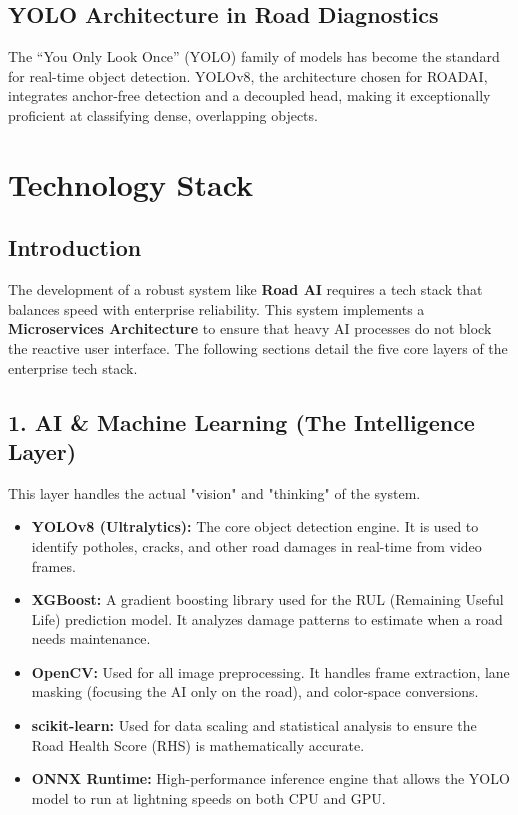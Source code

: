 \documentclass[12pt,a4paper]{report}
\begin{document}
\section{YOLO Architecture in Road Diagnostics}
The ``You Only Look Once'' (YOLO) family of models has become the standard for real-time object detection. YOLOv8, the architecture chosen for ROADAI, integrates anchor-free detection and a decoupled head, making it exceptionally proficient at classifying dense, overlapping objects.

\chapter{Technology Stack}

\section{Introduction}
The development of a robust system like \textbf{Road AI} requires a tech stack that balances speed with enterprise reliability. This system implements a \textbf{Microservices Architecture} to ensure that heavy AI processes do not block the reactive user interface. The following sections detail the five core layers of the enterprise tech stack.

\section{1. AI \& Machine Learning (The Intelligence Layer)}
This layer handles the actual "vision" and "thinking" of the system.
\begin{itemize}
    \item \textbf{YOLOv8 (Ultralytics):} The core object detection engine. It is used to identify potholes, cracks, and other road damages in real-time from video frames.
    \item \textbf{XGBoost:} A gradient boosting library used for the RUL (Remaining Useful Life) prediction model. It analyzes damage patterns to estimate when a road needs maintenance.
    \item \textbf{OpenCV:} Used for all image preprocessing. It handles frame extraction, lane masking (focusing the AI only on the road), and color-space conversions.
    \item \textbf{scikit-learn:} Used for data scaling and statistical analysis to ensure the Road Health Score (RHS) is mathematically accurate.
    \item \textbf{ONNX Runtime:} High-performance inference engine that allows the YOLO model to run at lightning speeds on both CPU and GPU.
\end{itemize}
\end{document}
